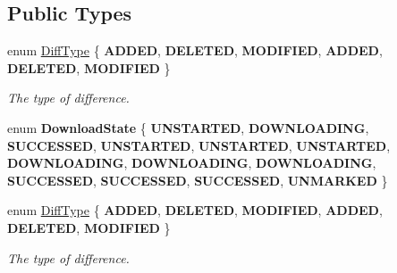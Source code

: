 \subsection*{Public Types}
\begin{DoxyCompactItemize}
\item 
\mbox{\label{classManifest_a0d036780e84e6ef32c9431acd5f9fdc7}} 
enum \hyperlink{classManifest_a0d036780e84e6ef32c9431acd5f9fdc7}{Diff\+Type} \{ \newline
{\bfseries A\+D\+D\+ED}, 
{\bfseries D\+E\+L\+E\+T\+ED}, 
{\bfseries M\+O\+D\+I\+F\+I\+ED}, 
{\bfseries A\+D\+D\+ED}, 
\newline
{\bfseries D\+E\+L\+E\+T\+ED}, 
{\bfseries M\+O\+D\+I\+F\+I\+ED}
 \}\begin{DoxyCompactList}\small\item\em The type of difference. \end{DoxyCompactList}
\item 
\mbox{\label{classManifest_a810f11fce45c13d07dc3466200e8561e}} 
enum {\bfseries Download\+State} \{ \newline
{\bfseries U\+N\+S\+T\+A\+R\+T\+ED}, 
{\bfseries D\+O\+W\+N\+L\+O\+A\+D\+I\+NG}, 
{\bfseries S\+U\+C\+C\+E\+S\+S\+ED}, 
{\bfseries U\+N\+S\+T\+A\+R\+T\+ED}, 
\newline
{\bfseries U\+N\+S\+T\+A\+R\+T\+ED}, 
{\bfseries U\+N\+S\+T\+A\+R\+T\+ED}, 
{\bfseries D\+O\+W\+N\+L\+O\+A\+D\+I\+NG}, 
{\bfseries D\+O\+W\+N\+L\+O\+A\+D\+I\+NG}, 
\newline
{\bfseries D\+O\+W\+N\+L\+O\+A\+D\+I\+NG}, 
{\bfseries S\+U\+C\+C\+E\+S\+S\+ED}, 
{\bfseries S\+U\+C\+C\+E\+S\+S\+ED}, 
{\bfseries S\+U\+C\+C\+E\+S\+S\+ED}, 
\newline
{\bfseries U\+N\+M\+A\+R\+K\+ED}
 \}
\item 
\mbox{\label{classManifest_a0d036780e84e6ef32c9431acd5f9fdc7}} 
enum \hyperlink{classManifest_a0d036780e84e6ef32c9431acd5f9fdc7}{Diff\+Type} \{ \newline
{\bfseries A\+D\+D\+ED}, 
{\bfseries D\+E\+L\+E\+T\+ED}, 
{\bfseries M\+O\+D\+I\+F\+I\+ED}, 
{\bfseries A\+D\+D\+ED}, 
\newline
{\bfseries D\+E\+L\+E\+T\+ED}, 
{\bfseries M\+O\+D\+I\+F\+I\+ED}
 \}\begin{DoxyCompactList}\small\item\em The type of difference. \end{DoxyCompactList}

\end{DoxyCompactItemize}
